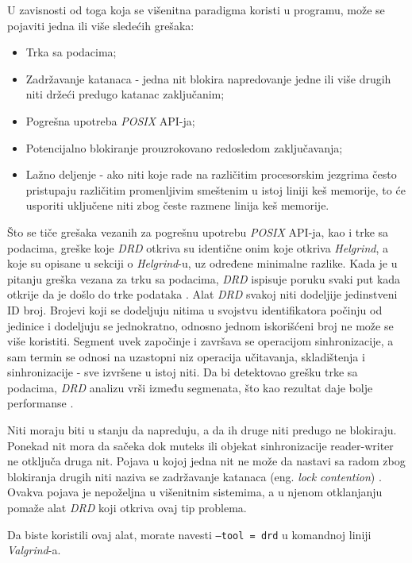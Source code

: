 \documentclass[12pt,oneside]{memoir}
\theoremstyle{plain}
\theoremstyle{definition}
\begin{document}
U zavisnosti od toga koja se višenitna paradigma koristi u programu, može se pojaviti jedna ili više sledećih grešaka:
\begin{itemize}
\item Trka sa podacima;
\item Zadržavanje katanaca - jedna nit blokira napredovanje jedne ili više drugih niti držeći predugo katanac zaključanim;
\item Pogrešna upotreba \textit{POSIX} API-ja;
\item Potencijalno blokiranje prouzrokovano redosledom zaključavanja;
\item Lažno deljenje - ako niti koje rade na različitim procesorskim jezgrima često pristupaju različitim promenljivim smeštenim u istoj liniji keš memorije, to će usporiti uključene niti zbog česte razmene linija keš memorije.
\end{itemize} 

Što se tiče grešaka vezanih za pogrešnu upotrebu \textit{POSIX} API-ja, kao i trke sa podacima, greške koje \textit{DRD} otkriva su identične onim koje otkriva \textit{Helgrind}, a koje su opisane u sekciji o \textit{Helgrind}-u, uz određene minimalne razlike. Kada je u pitanju greška vezana za trku sa podacima, \textit{DRD} ispisuje poruku svaki put kada otkrije da je došlo do trke podataka \cite{Drd}. Alat \textit{DRD} svakoj niti dodeljije jedinstveni ID broj. Brojevi koji se dodeljuju nitima u svojstvu identifikatora počinju od jedinice i dodeljuju se jednokratno, odnosno jednom iskorišćeni broj ne može se više koristiti. Segment uvek započinje i završava se operacijom sinhronizacije, a sam termin se odnosi na uzastopni niz operacija učitavanja, skladištenja i sinhronizacije - sve izvršene u istoj niti. Da bi detektovao grešku trke sa podacima, \textit{DRD} analizu vrši između segmenata, što kao rezultat daje bolje performanse \cite{Drd}.

Niti moraju biti u stanju da napreduju, a da ih druge niti predugo ne blokiraju. Ponekad nit mora da sačeka dok muteks ili objekat sinhronizacije reader-writer ne otključa druga nit. Pojava u kojoj jedna nit ne može da nastavi sa radom zbog blokiranja drugih niti naziva se zadržavanje katanaca (eng. \textit{lock contention})  \cite{Drd}. Ovakva pojava je nepoželjna u višenitnim sistemima, a u njenom otklanjanju pomaže alat \textit{DRD} koji otkriva ovaj tip problema. 

Da biste koristili ovaj alat, morate navesti \texttt{--tool = drd} u komandnoj liniji \textit{Valgrind}-a.
\end{document}
